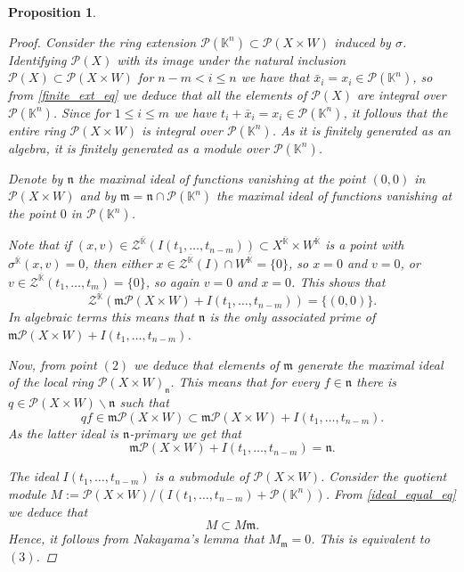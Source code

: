 \documentclass{amsart}
\theoremstyle{plain}
\newtheorem{prop}[thm]{Proposition}
\theoremstyle{definition}
\theoremstyle{remark}
\numberwithin{equation}{section}
\newcommand{\K}{\mathbb{K}}
\newcommand{\PP}{\mathcal{P}}
\newcommand{\Z}{\mathcal{Z}}
\begin{document}
\begin{prop}
\begin{proof}
Consider the ring extension $\PP(\K^n)\subset \PP(X\times W)$ induced by $\sigma$. Identifying $\PP(X)$ with its image under the natural inclusion $\PP(X)\subset \PP(X\times W)$ for $n-m< i \leq n$ we have that $\bar{x}_i= x_i\in \PP(\K^n)$, so from \eqref{finite_ext_eq} we deduce that all the elements of $\PP(X)$ are integral over $\PP(\K^n)$. Since for $1\leq i \leq m$ we have $t_i+\bar{x}_i= x_i\in \PP(\K^n)$, it follows that the entire ring $\PP(X\times W)$ is integral over $\PP(\K^n)$. As it is finitely generated as an algebra, it is finitely generated as a module over $\PP(\K^n)$. 

Denote by $\mathfrak{n}$ the maximal ideal of functions vanishing at the point $(0,0)$ in $\PP(X\times W)$ and by $\mathfrak{m}=\mathfrak{n}\cap \PP(\K^n)$ the maximal ideal of functions vanishing at the point $0$ in $\PP(\K^n)$. 

Note that if $(x,v)\in \Z^{\overline{\K}}(I(t_1,\dots,t_{n-m}))\subset X^{\overline{\K}}\times W^{\overline{\K}}$ is a point with $\sigma^{\overline{\K}}(x,v)=0$, then either $x\in \Z^{\overline{\K}}(I)\cap W^{\overline{\K}}=\{0\}$, so $x=0$ and $v=0$, or $v\in \Z^{\overline{\K}}(t_1,\dots,t_m)=\{0\}$, so again $v=0$ and $x=0$. This shows that 
\begin{equation*}
    \Z^{\overline{\K}}(\mathfrak{m}\PP(X\times W) +I(t_1,\dots,t_{n-m}))=\{(0,0)\}.
\end{equation*}
In algebraic terms this means that $\mathfrak{n}$ is the only associated prime of $\mathfrak{m}\PP(X\times W) +I(t_1,\dots,t_{n-m})$.

Now, from point $(2)$ we deduce that elements of $\mathfrak{m}$ generate the maximal ideal of the local ring $\PP(X\times W)_{\mathfrak{n}}$. This means that for every $f\in\mathfrak{n}$ there is $q\in\PP(X\times W)\backslash\mathfrak{n}$ such that
\begin{equation*}
	qf\in \mathfrak{m}\PP(X\times W)\subset \mathfrak{m}\PP(X\times W) +I(t_1,\dots,t_{n-m}).
\end{equation*}
As the latter ideal is $\mathfrak{n}$-primary we get that 
\begin{equation}\label{ideal_equal_eq}
	\mathfrak{m}\PP(X\times W) +I(t_1,\dots,t_{n-m})=\mathfrak{n}.
\end{equation}

The ideal $I(t_1,\dots,t_{n-m})$ is a submodule of $\PP(X\times W)$. Consider the quotient module $M:=\PP(X\times W)/(I(t_1,\dots,t_{n-m})+\PP(\K^n))$. From \eqref{ideal_equal_eq} we deduce that 
\begin{equation*}
	M\subset M\mathfrak{m}.
\end{equation*}
Hence, it follows from Nakayama's lemma that $M_{\mathfrak{m}}=0$. This is equivalent to $(3)$.
\end{proof}
\end{prop}
\end{document}
